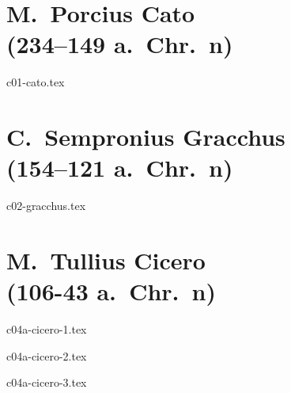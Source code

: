 \documentclass[a4paper,12pt,twoside]{report}
\begin{document}


\chapter[Cato]{M.\ Porcius Cato \\(234–149 a.~Chr.~n)}

{c01-cato.tex}

\chapter[C.\ Gracchus]{C.\ Sempronius Gracchus \\(154–121 a.~Chr.~n)}

{c02-gracchus.tex}

\chapter[Cicero]{M.\ Tullius Cicero \\(106-43 a.~Chr.~n)}

{c04a-cicero-1.tex}

{c04a-cicero-2.tex}

{c04a-cicero-3.tex}




\end{document}
